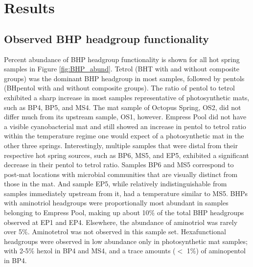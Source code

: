\section{Results}

\subsection{Observed BHP headgroup functionality}


Percent abundance of BHP headgroup functionality is shown for all hot spring samples in Figure \ref{fig:BHP_abund}. Tetrol (BHT with and without composite groups) was the dominant BHP headgroup in most samples, followed by pentols (BHpentol with and without composite groups). The ratio of pentol to tetrol exhibited a sharp increase in most samples representative of photosynthetic mats, such as BP4, BP5, and MS4. The mat sample of Octopus Spring, OS2, did not differ much from its upstream sample, OS1, however. Empress Pool did not have a visible cyanobacterial mat and still showed an increase in pentol to tetrol ratio within the temperature regime one would expect of a photosynthetic mat in the other three springs. Interestingly, multiple samples that were distal from their respective hot spring sources, such as BP6, MS5, and EP5, exhibited a significant decrease in their pentol to tetrol ratio. Samples BP6 and MS5 correspond to post-mat locations with microbial communities that are visually distinct from those in the mat. And sample EP5, while relatively indistinguishable from samples immediately upstream from it, had a temperature similar to MS5. BHPs with aminotriol headgroups were proportionally most abundant in samples belonging to Empress Pool, making up about 10\% of the total BHP headgroups observed at EP1 and EP4. Elsewhere, the abundance of aminotriol was rarely over 5\%. Aminotetrol was not observed in this sample set. Hexafunctional headgroups were observed in low abundance only in photosynthetic mat samples; with 2-5\% hexol in BP4 and MS4, and a trace amounts ($<$ 1\%) of aminopentol in BP4.

